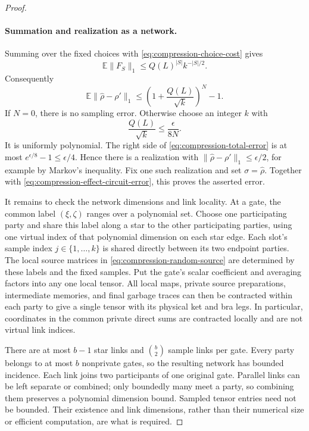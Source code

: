 \documentclass[11pt]{article}
\numberwithin{equation}{section}
\theoremstyle{definition}
\theoremstyle{remark}
\begin{document}
\begin{proof}
\paragraph{Summation and realization as a network.}
Summing over the fixed choices with
\eqref{eq:compression-choice-cost} gives
\[
 \mathbb E\lVert F_S\rVert_1\le Q(L)^{|S|}k^{-|S|/2}.
\]
Consequently
\begin{equation}
 \mathbb E\lVert \widehat\rho-\rho'\rVert_1
 \le\left(1+\frac{Q(L)}{\sqrt k}\right)^N-1.
 \label{eq:compression-total-error}
\end{equation}
If $N=0$, there is no sampling error.  Otherwise choose an integer
$k$ with
\[
 \frac{Q(L)}{\sqrt k}\le\frac{\epsilon}{8N}.
\]
It is uniformly polynomial.  The right side of
\eqref{eq:compression-total-error} is at most
$e^{\epsilon/8}-1\le\epsilon/4$.  Hence there is a realization with
$\lVert \widehat\rho-\rho'\rVert_1\le\epsilon/2$, for example by Markov's
inequality.  Fix one such realization and set $\sigma=\widehat\rho$.
Together with \eqref{eq:compression-effect-circuit-error}, this proves
the asserted error.

It remains to check the network dimensions and link locality.  At a
gate, the common label $(\xi,\zeta)$ ranges over a polynomial set.
Choose one participating party and share this label along a star to
the other participating parties, using one virtual index of that
polynomial dimension on each star edge.  Each slot's sample index
$j\in\{1,\ldots,k\}$ is shared directly between its two endpoint
parties.  The local source matrices in
\eqref{eq:compression-random-source} are determined by these labels
and the fixed samples.  Put the gate's scalar coefficient and averaging
factors into any one local tensor.  All local maps, private source
preparations, intermediate memories, and final garbage traces can then
be contracted within each party to give a single tensor with its
physical ket and bra legs.  In particular, coordinates in the common
private direct sums are contracted locally and are not virtual link
indices.

There are at most $b-1$ star links and $\binom b2$ sample links per
gate.  Every party belongs to at most $b$ nonprivate gates, so the
resulting network has bounded incidence.  Each link joins two
participants of one original gate.  Parallel links can be left
separate or combined; only boundedly many meet a party, so combining
them preserves a polynomial dimension bound.  Sampled tensor entries
need not be bounded.  Their existence and link dimensions, rather than
their numerical size or efficient computation, are what is required.


\end{proof}
\end{document}
